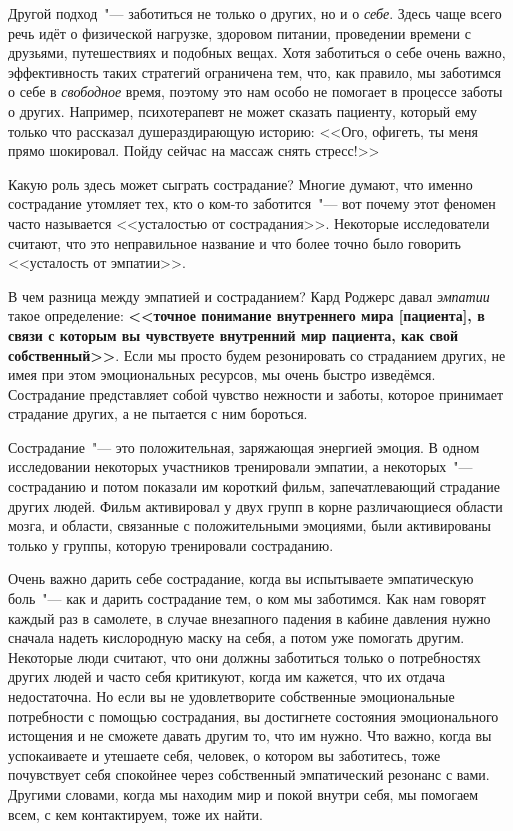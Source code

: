 Другой подход~"--- заботиться не только о других, но и о \emph{себе}. Здесь чаще всего речь идёт о физической нагрузке, здоровом питании, проведении времени с друзьями, путешествиях и подобных вещах. Хотя заботиться о себе очень важно, эффективность таких стратегий ограничена тем, что, как правило, мы заботимся о себе в \emph{свободное} время, поэтому это нам особо не помогает в процессе заботы о других. Например,  психотерапевт не может сказать пациенту, который ему только что рассказал душераздирающую историю: <<Ого, офигеть, ты меня прямо шокировал. Пойду сейчас на массаж снять стресс!>>

Какую роль здесь может сыграть сострадание? Многие думают, что именно сострадание утомляет тех, кто о ком-то заботится~"--- вот почему этот феномен часто называется <<усталостью от сострадания>>. Некоторые исследователи считают, что это неправильное название и что более точно было говорить <<усталость от эмпатии>>\cite{102}.

В чем разница между эмпатией и состраданием? Кард Роджерс давал \emph{эмпатии} такое определение: \textbf{<<точное понимание внутреннего мира [пациента], в связи с которым вы чувствуете внутренний мир пациента, как свой собственный>>}\cite{103}. Если мы просто будем резонировать со страданием других, не имея при этом эмоциональных ресурсов, мы очень быстро изведёмся. Сострадание представляет собой чувство нежности и заботы, которое принимает страдание других, а не пытается с ним бороться.

Сострадание~"--- это положительная, заряжающая энергией эмоция. В одном исследовании некоторых участников тренировали эмпатии, а некоторых~"--- состраданию и потом показали им короткий фильм, запечатлевающий страдание других людей\cite{104}. Фильм активировал у двух групп в корне различающиеся области мозга, и области, связанные с положительными эмоциями, были активированы только у группы, которую тренировали состраданию.

Очень важно дарить себе сострадание, когда вы испытываете эмпатическую боль~"--- как и дарить сострадание тем, о ком мы заботимся. Как нам говорят каждый раз в самолете, в случае внезапного падения в кабине давления нужно сначала надеть кислородную маску на себя, а потом уже помогать другим. Некоторые люди считают, что они должны заботиться только о потребностях других людей и часто себя критикуют, когда им кажется, что их отдача недостаточна. Но если вы не удовлетворите собственные эмоциональные потребности с помощью сострадания, вы достигнете состояния эмоционального истощения и не сможете давать другим то, что им нужно. Что важно, когда вы успокаиваете и утешаете себя, человек, о котором вы заботитесь, тоже почувствует себя спокойнее через собственный эмпатический резонанс с вами. Другими словами, когда мы находим мир и покой внутри себя, мы помогаем всем, с кем контактируем, тоже их найти.  

